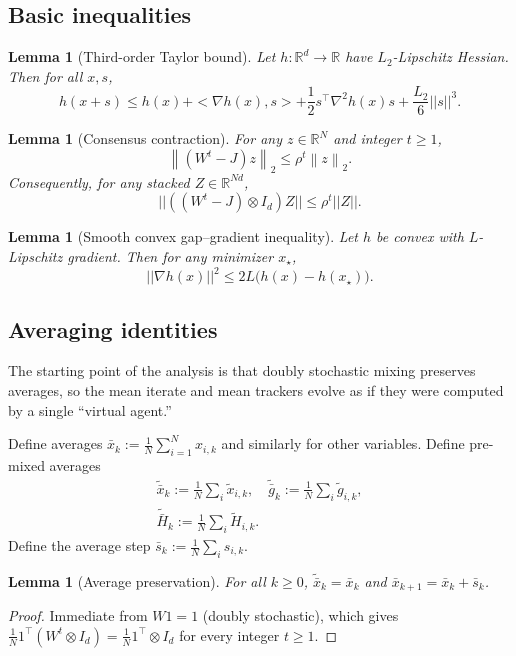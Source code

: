 \documentclass[11pt,a4paper]{article}
\def\one{1}%
\def\J{J}%
\def\norm#1{||#1||}%
\def\ip#1#2{<#1,#2>}%
\newtheorem{lemma}[theorem]{Lemma}
\newcommand{\R}{\mathbb{R}}
\newcommand{\one}{\mathbf{1}}
\newcommand{\ip}[2]{\left\langle #1,#2\right\rangle}
\newcommand{\norm}[1]{\left\|#1\right\|}
\newcommand{\normtwo}[1]{\left\|#1\right\|_2}
\newcommand{\J}{\left(\frac{1}{N}\one\one^\top\right)}
\begin{document}
\subsection{Basic inequalities}\label{ssec:basic}
\begin{lemma}[Third-order Taylor bound]\label{lem:taylor3}
Let $h:\R^d\to\R$ have $L_2$-Lipschitz Hessian. Then for all $x,s$,
\[
h(x+s)\le h(x)+\ip{\nabla h(x)}{s}+\frac12 s^\top\nabla^2 h(x)s+\frac{L_2}{6}\norm{s}^3.
\]
\end{lemma}

\begin{lemma}[Consensus contraction]\label{lem:consensus}
For any $z\in\R^N$ and integer $t\ge 1$,
\[
\normtwo{(W^t-\J)z}\le \rho^t\normtwo{z}.
\]
Consequently, for any stacked $Z\in\R^{Nd}$,
\[
\norm{((W^t-\J)\otimes I_d)Z}\le \rho^t\norm{Z}.
\]
\end{lemma}

\begin{lemma}[Smooth convex gap--gradient inequality]\label{lem:gap-grad}
Let $h$ be convex with $L$-Lipschitz gradient. Then for any minimizer $x_\star$,
\[
\norm{\nabla h(x)}^2\le 2L\big(h(x)-h(x_\star)\big).
\]
\end{lemma}

\subsection{Averaging identities}\label{ssec:avg}
The starting point of the analysis is that doubly stochastic mixing
preserves averages, so the mean iterate and mean trackers evolve as if
they were computed by a single ``virtual agent.''

Define averages $\bar x_k:=\frac1N\sum_{i=1}^N x_{i,k}$ and similarly for other variables.
Define pre-mixed averages
\begin{gather*}
\tilde{\bar x}_k:=\tfrac1N\!\sum_i \tilde x_{i,k},\quad
\tilde{\bar g}_k:=\tfrac1N\!\sum_i \tilde g_{i,k},\\
\tilde{\bar H}_k:=\tfrac1N\!\sum_i \tilde H_{i,k}.
\end{gather*}
Define the average step $\bar s_k:=\frac1N\sum_i s_{i,k}$.

\begin{lemma}[Average preservation]\label{lem:avg-pres}
For all $k\ge0$, $\tilde{\bar x}_k=\bar x_k$ and $\bar x_{k+1}=\bar x_k+\bar s_k$.
\end{lemma}
\begin{proof}
Immediate from $W\one=\one$ (doubly stochastic),
which gives $\frac1N\one^\top(W^t\otimes I_d)=\frac1N\one^\top\otimes I_d$
for every integer $t\ge 1$.
\end{proof}
\end{document}
